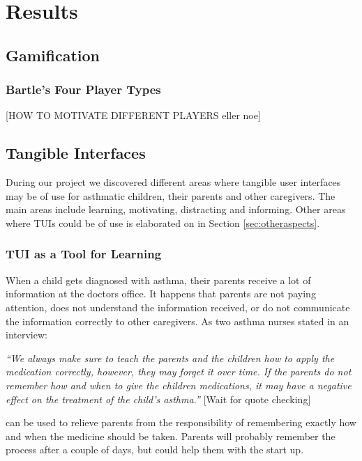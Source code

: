 \chapter{Results}
\label{chp:results}

\section{Gamification}
\label{sec:gamificationresults}



\subsection{Bartle's Four Player Types}
[HOW TO MOTIVATE DIFFERENT PLAYERS eller noe]

\section{Tangible Interfaces}
\label{sec:resultstui}
During our project we discovered different areas where tangible user interfaces may be of use for asthmatic children, their parents and other caregivers. The main areas include learning, motivating, distracting and informing. Other areas where TUIs could be of use is elaborated on in Section \ref{sec:otheraspects}.


\subsection{TUI as a Tool for Learning}

When a child gets diagnosed with asthma, their parents receive a lot of information at the doctors office. It happens that parents are not paying attention, does not understand the information received, or do not communicate the information correctly to other caregivers. As two asthma nurses stated in an interview: 

\textit{``We always make sure to teach the parents and the children how to apply the medication correctly, however, they may forget it over time. If the parents do not remember how and when to give the children medications, it may have a negative effect on the treatment of the child's asthma.''}
[Wait for quote checking]

\buddy{} can be used to relieve parents from the responsibility of remembering exactly how and when the medicine should be taken. Parents will probably remember the process after a couple of days, but \buddy{} could help them with the start up. 

